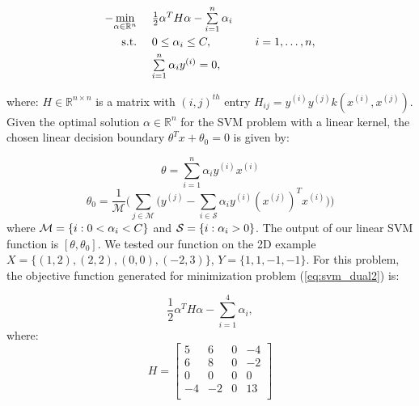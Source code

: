 \begin{equation}
\label{eq:svm_dual2}
\begin{array}{rll}
-\underset{\alpha \in \mathbb{R}^n}{\min}~ & \frac{1}{2} \alpha^T H \alpha - \sum\limits_{i = 1}^n \alpha_i \vspace{3pt}\\
\textup{s.t.}~ & 0 \leq \alpha_i \leq C,&~~~i=1,\ldots ,n, \vspace{3pt}\\
& \sum\limits_{i = 1}^n \alpha_i y^{(i)} = 0, & \vspace{5pt}\\
\end{array}
\end{equation}
where:  $H \in \mathbb{R}^{n \times n}$ is a matrix with $(i,j)^{th}$ entry $H_{ij} = y^{(i)} y^{(j)} k(x^{(i)}, x^{(j)})$.  Given the optimal solution $\alpha \in \mathbb{R}^n$ for the SVM problem with a linear kernel, the chosen linear decision boundary $\theta^T x + \theta_0 = 0$ is given by:

\begin{equation}
\label{eq:svm_theta}
\theta = \sum\limits_{i = 1}^n \alpha_i y^{(i)} x^{(i)}
\end{equation}
\begin{equation}
\label{eq:svm_theta_0}
\theta_0 = \frac{1}{\mathcal{M}} \Big(\sum\limits_{j \in \mathcal{M}} \Big(y^{(j)} - \sum\limits_{i \in \mathcal{S}}\alpha_i y^{(i)} (x^{(j)})^T x^{(i)} \Big)\Big)
\end{equation}
where ${\mathcal M} = \{i : 0 < \alpha_i < C\}$ and ${\mathcal S} = \{i : \alpha_i > 0\}$.
The output of our linear SVM function is $[\theta, \theta_0]$.  We tested our function on the 2D example $X = \{(1,2),(2,2),(0,0),(-2,3)\}$, $Y = \{1,1,-1,-1\}$.  
For this problem, the objective function generated for minimization problem (\ref{eq:svm_dual2}) is:

\begin{equation}
\label{eq:svm_objective1}
\frac{1}{2} \alpha^T H \alpha - \sum\limits_{i = 1}^4 \alpha_i,
\end{equation}
where:
\[
H = \begin{bmatrix}
     5   &  6  &   0  &  -4 \\
     6   &  8  &   0  &  -2 \\
     0   &  0  &   0  &   0 \\
    -4   & -2  &  0  &   13 \\
\end{bmatrix}
\]

